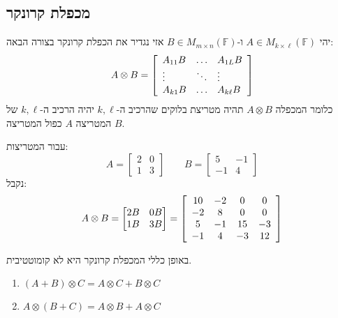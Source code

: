 \documentclass{tstextbook}
\begin{document}
\subsection{מכפלת קרונקר}

\begin{definition}
יהי \(A \in M_{k\times \ell}\left( \mathbb{F}  \right)\) ו-\(B \in M_{m\times n}\left( \mathbb{F}  \right)\) אזי נגדיר את הכפלת קרונקר בצורה הבאה:
$$A\otimes B={\left[\begin{array}{l l l}{A_{11}B}&{\ldots}&{A_{1L}B}\\ {\vdots}&{\ddots}&{\vdots}\\ {A_{k1}B}&{\ldots}&{A_{k\ell}B}\end{array}\right]}$$
כלומר המכפלה \(A\otimes B\) תהיה מטריצת בלוקים שהרכיב ה-\(k,\ell\) יהיה הרכיב ה-\(k,\ell\) של המטריצה \(A\) כפול המטריצה \(B\).

\end{definition}
\begin{example}
עבור המטריצות:
$$A=\begin{bmatrix}2 & 0 \\1 & 3\end{bmatrix}\qquad B=\begin{bmatrix}5 & -1 \\-1 & 4
\end{bmatrix}$$
נקבל:
$$A\otimes B=\begin{bmatrix}2B & 0B \\1B & 3B
\end{bmatrix}=\left[\begin{array}{c c c c}{{10}}&{{-2}}&{{0}}&{{0}}\\ {{-2}}&{{8}}&{{0}}&{{0}}\\ {{5}}&{{-1}}&{{15}}&{{-3}}\\  {{-1}}&{{4}}&{{-3}}&{{12}}\end{array}\right]$$

\end{example}
\begin{remark}
באופן כללי המכפלת קרונקר היא לא קומוטטיבית.

\end{remark}
\begin{proposition}[פילוגיות]
  \begin{enumerate}
    \item \((A+B)\otimes C=A\otimes C+B\otimes C\)


    \item \(A\otimes(B+C)=A\otimes B+A\otimes C\)


  \end{enumerate}
\end{proposition}
\end{document}
